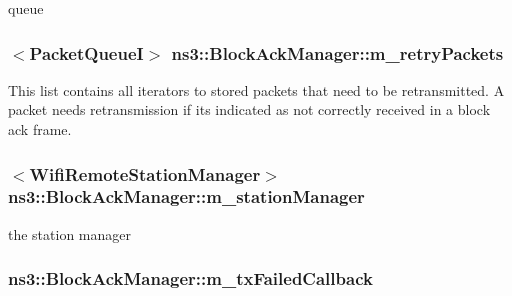 queue 

\subsubsection[{\texorpdfstring{m\+\_\+retry\+Packets}{m_retryPackets}}]{$<${\bf Packet\+QueueI}$>$ ns3\+::\+Block\+Ack\+Manager\+::m\+\_\+retry\+Packets\hspace{0.3cm}{\ttfamily [private]}}\hypertarget{classns3_1_1BlockAckManager_a2851f947dd68945ebc25961cff893ed9}{}\label{classns3_1_1BlockAckManager_a2851f947dd68945ebc25961cff893ed9}
This list contains all iterators to stored packets that need to be retransmitted. A packet needs retransmission if it\textquotesingle{}s indicated as not correctly received in a block ack frame. 
\subsubsection[{\texorpdfstring{m\+\_\+station\+Manager}{m_stationManager}}]{$<${\bf Wifi\+Remote\+Station\+Manager}$>$ ns3\+::\+Block\+Ack\+Manager\+::m\+\_\+station\+Manager\hspace{0.3cm}{\ttfamily [private]}}\hypertarget{classns3_1_1BlockAckManager_afb809abb11edae6179dc2f5b8c1f8ce5}{}\label{classns3_1_1BlockAckManager_afb809abb11edae6179dc2f5b8c1f8ce5}


the station manager 

\subsubsection[{\texorpdfstring{m\+\_\+tx\+Failed\+Callback}{m_txFailedCallback}}]{ ns3\+::\+Block\+Ack\+Manager\+::m\+\_\+tx\+Failed\+Callback\hspace{0.3cm}{\ttfamily [private]}}\hypertarget{classns3_1_1BlockAckManager_a58ccfd5da1b7e739b732699ddcc13530}{}\label{classns3_1_1BlockAckManager_a58ccfd5da1b7e739b732699ddcc13530}


